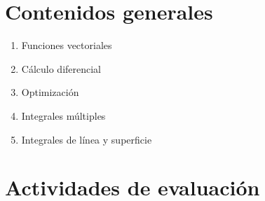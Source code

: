 \documentclass[a4,11pt]{aleph-notas}
\begin{document}
\section{Contenidos generales} 

\begin{enumerate}
    \item Funciones vectoriales
    \item Cálculo diferencial
    \item Optimización
    \item Integrales múltiples
    \item Integrales de línea y superficie
\end{enumerate}

\section{Actividades de evaluación} 
\end{document}
